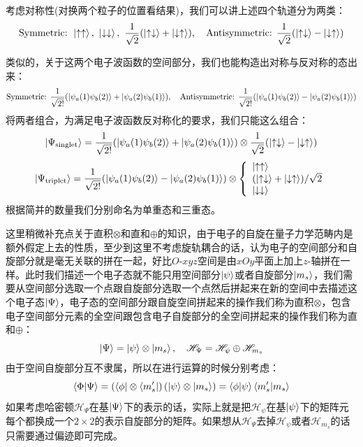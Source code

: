 考虑对称性(对换两个粒子的位置看结果)，我们可以讲上述四个轨道分为两类：
\[\text{Symmetric: }\ket{\uparrow\uparrow}, \ \ket{\downarrow\downarrow}, \ \frac{1}{\sqrt{2}}(\ket{\uparrow\downarrow}+\ket{\downarrow\uparrow}), \quad \text{Antisymmetric: }\frac{1}{\sqrt{2}}(\ket{\uparrow\downarrow}-\ket{\downarrow\uparrow})\]

类似的，关于这两个电子波函数的空间部分，我们也能构造出对称与反对称的态出来：
\[\text{Symmetric: }\frac{1}{\sqrt{2!}}(\ket{\psi_a(1)\psi_b(2)}+\ket{\psi_a(2)\psi_b(1)}), \quad \text{Antisymmetric: }\frac{1}{\sqrt{2!}}(\ket{\psi_a(1)\psi_b(2)}-\ket{\psi_a(2)\psi_b(1)})\]
将两者组合，为满足电子波函数反对称化的要求，我们只能这么组合：
\[\ket{\Psi_{\rm{singlet}}}=\frac{1}{\sqrt{2!}}(\ket{\psi_a(1)\psi_b(2)}+\ket{\psi_a(2)\psi_b(1)})\otimes\frac{1}{\sqrt{2}}(\ket{\uparrow\downarrow}-\ket{\downarrow\uparrow})\]
\[\ket{\Psi_{\rm{triplet}}}=\frac{1}{\sqrt{2!}}(\ket{\psi_a(1)\psi_b(2)}-\ket{\psi_a(2)\psi_b(1)})\otimes \left\{
    \begin{array}{l}
        \ket{\uparrow\uparrow}\\
        (\ket{\uparrow\downarrow}+\ket{\downarrow\uparrow})/\sqrt{2}\\
        \ket{\downarrow\downarrow}
    \end{array}
\right.
\]
根据简并的数量我们分别命名为单重态和三重态。

这里稍微补充点关于直积$\otimes$和直和$\oplus$的知识，由于电子的自旋在量子力学范畴内是额外假定上去的性质，至少到这里不考虑旋轨耦合的话，认为电子的空间部分和自旋部分就是毫无关联的拼在一起，好比$O$-$xyz$空间是由$xOy$平面上加上$z$-轴拼在一样。此时我们描述一个电子态就不能只用空间部分$\ket{\psi}$或者自旋部分$\ket{m_s}$，我们需要从空间部分选取一个点跟自旋部分选取一个点然后拼起来在新的空间中去描述这个电子态$\ket{\Psi}$，电子态的空间部分跟自旋空间拼起来的操作我们称为直积$\otimes$，包含电子空间部分元素的全空间跟包含电子自旋部分的全空间拼起来的操作我们称为直和$\oplus$：
\[\ket{\Psi}=\ket{\psi}\otimes\ket{m_s}, \quad \mathscr{H}_{\Psi}=\mathscr{H}_{\psi}\oplus\mathscr{H}_{m_s}\]
由于空间自旋部分互不隶属，所以在进行运算的时候分别考虑：
\[\bra{\Phi}\ket{\Psi}=\left(\bra{\phi}\otimes\bra{m_s'}\right)\left(\ket{\psi}\otimes\ket{m_s}\right)=\bra{\phi}\ket{\psi}\bra{m_s'}\ket{m_s}\]
如果考虑哈密顿$\mathscr{H}_{\Psi}$在基$\ket{\Psi}$下的表示的话，实际上就是把$\mathscr{H}_{\psi}$在基$\ket{\psi}$下的矩阵元每个都换成一个$2\times2$的表示自旋部分的矩阵。如果想从$\mathscr{H}_{\Psi}$去掉$\mathscr{H}_{\psi}$或者$\mathscr{H}_{m_s}$的话只需要通过偏迹即可完成。

